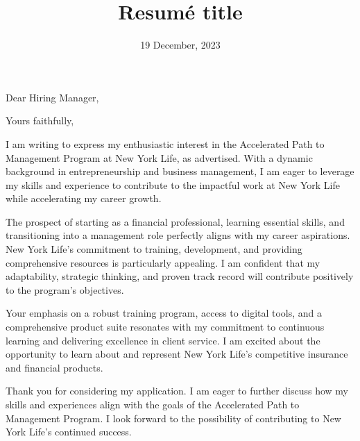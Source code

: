 \documentclass[11pt,a4paper,sans]{moderncv}        %
\title{Resumé title}                               %
\begin{document}
\date{19 December, 2023}
\opening{Dear Hiring Manager,}
\closing{Yours faithfully,}         %
\makelettertitle

I am writing to express my enthusiastic interest in the Accelerated Path to Management Program at New York Life, as advertised. With a dynamic background in entrepreneurship and business management, I am eager to leverage my skills and experience to contribute to the impactful work at New York Life while accelerating my career growth.

The prospect of starting as a financial professional, learning essential skills, and transitioning into a management role perfectly aligns with my career aspirations. New York Life's commitment to training, development, and providing comprehensive resources is particularly appealing. I am confident that my adaptability, strategic thinking, and proven track record will contribute positively to the program's objectives.

Your emphasis on a robust training program, access to digital tools, and a comprehensive product suite resonates with my commitment to continuous learning and delivering excellence in client service. I am excited about the opportunity to learn about and represent New York Life's competitive insurance and financial products.

Thank you for considering my application. I am eager to further discuss how my skills and experiences align with the goals of the Accelerated Path to Management Program. I look forward to the possibility of contributing to New York Life's continued success.

\makeletterclosing
\end{document}
